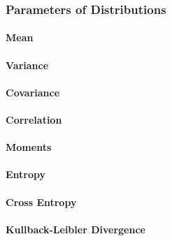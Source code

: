 
\subsubsection{Parameters of Distributions}

\paragraph{Mean}

\paragraph{Variance}

\paragraph{Covariance}

\paragraph{Correlation}

\paragraph{Moments}

\paragraph{Entropy}

\paragraph{Cross Entropy}


\paragraph{Kullback-Leibler Divergence}





